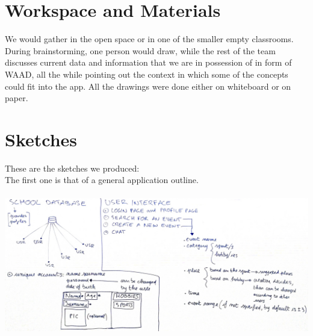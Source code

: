 \documentclass[12pt]{report}
\begin{document}
	\section*{\huge Workspace and Materials}
	We would gather in the open space or in one of the smaller empty classrooms. During brainstorming, one person would draw, while the rest of the team discusses current data and information that we are in possession of in form of WAAD, all the while pointing out the context in which some of the concepts could fit into the app. All the drawings were done either on whiteboard or on paper.
	
	\section*{\huge Sketches}
	These are the sketches we produced:\\
	The first one is that of a general application outline.\\\\
	\includegraphics[width=\linewidth]{FirstDesign.jpg}\break
	\newpage
	
\end{document}

